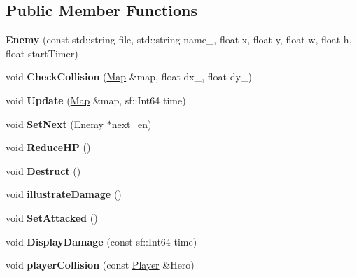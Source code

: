 \subsection*{Public Member Functions}
\begin{DoxyCompactItemize}
\item 
\mbox{\label{class_enemy_a7b9b492eeac5b510228c2c0d8757706f}} 
{\bfseries Enemy} (const std\+::string file, std\+::string name\+\_\+, float x, float y, float w, float h, float start\+Timer)
\item 
\mbox{\label{class_enemy_abe881a77eff5534c8bb024c168ca38d6}} 
void {\bfseries Check\+Collision} (\hyperlink{class_map}{Map} \&map, float dx\+\_\+, float dy\+\_\+)
\item 
\mbox{\label{class_enemy_a66d6e2b40b06aae79cd3fea45d5f48f9}} 
void {\bfseries Update} (\hyperlink{class_map}{Map} \&map, sf\+::\+Int64 time)
\item 
\mbox{\label{class_enemy_a73dcc317c01af52b3c97aa083d65de47}} 
void {\bfseries Set\+Next} (\hyperlink{class_enemy}{Enemy} $\ast$next\+\_\+en)
\item 
\mbox{\label{class_enemy_a3cf51ab0fd168ec3dc8bbeaebcb96928}} 
void {\bfseries Reduce\+HP} ()
\item 
\mbox{\label{class_enemy_a17c7a835e1ef65b5e181b53aa93c07e3}} 
void {\bfseries Destruct} ()
\item 
\mbox{\label{class_enemy_a3fb49a47746dc5396f0bc0b3081bf79f}} 
void {\bfseries illustrate\+Damage} ()
\item 
\mbox{\label{class_enemy_a03fcd0d6de2ef83669f381701f86d788}} 
void {\bfseries Set\+Attacked} ()
\item 
\mbox{\label{class_enemy_a4bd03366a45b265d91bb167007a38132}} 
void {\bfseries Display\+Damage} (const sf\+::\+Int64 time)
\item 
\mbox{\label{class_enemy_a6562574a2090a4e63322dd94485603d5}} 
void {\bfseries player\+Collision} (const \hyperlink{class_player}{Player} \&Hero)

\end{DoxyCompactItemize}
